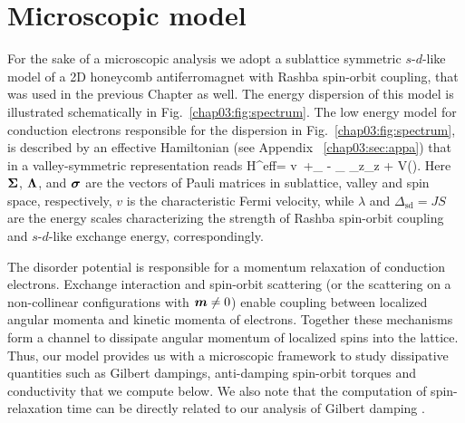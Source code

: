 \section{Microscopic model}

For the sake of a microscopic analysis we adopt a sublattice symmetric $s$-$d$-like model of a 2D honeycomb antiferromagnet with Rashba spin-orbit coupling, that was used in the previous Chapter as well. The energy dispersion of this model is illustrated schematically in Fig.~\ref{chap03:fig:spectrum}.  
The low energy model for conduction electrons responsible for the dispersion in Fig.~\ref{chap03:fig:spectrum}, is described by an effective Hamiltonian (see Appendix ~\ref{chap03:sec:appa}) that in a valley-symmetric representation reads
\be
\label{chap03:eff}
H^\textrm{eff}= v\, \cdot\bb{\Sigma}+\lambda\lt[\bb{\sigma}\times\bb{\Sigma}\rt]_{} - \Delta_{}\,\cdot\bb{\sigma}\,\Sigma_z\Lambda_z + V().
\e
Here $\boldsymbol{\Sigma}$, $\boldsymbol{\Lambda}$, and $\boldsymbol{\sigma}$ are the vectors of Pauli matrices in sublattice, valley and spin space, respectively, $v$ is the characteristic Fermi velocity, while $\lambda$ and $\Delta_{\text{sd}}=JS$ are the energy scales characterizing the strength of Rashba spin-orbit coupling and $s$-$d$-like exchange energy, correspondingly. 


The disorder potential is responsible for a momentum relaxation of conduction electrons. Exchange interaction and spin-orbit scattering (or the scattering on a non-collinear configurations with $\boldsymbol{m}\neq 0$) enable coupling between localized angular momenta and kinetic momenta of electrons. Together these mechanisms form a channel to dissipate angular momentum of localized spins into the lattice. Thus, our model provides us with a microscopic framework to study dissipative quantities such as Gilbert dampings, anti-damping spin-orbit torques and conductivity that we compute below. We also note that the computation of spin-relaxation time can be directly related to our analysis of Gilbert damping \cite{manchon_spin_2017}. 

